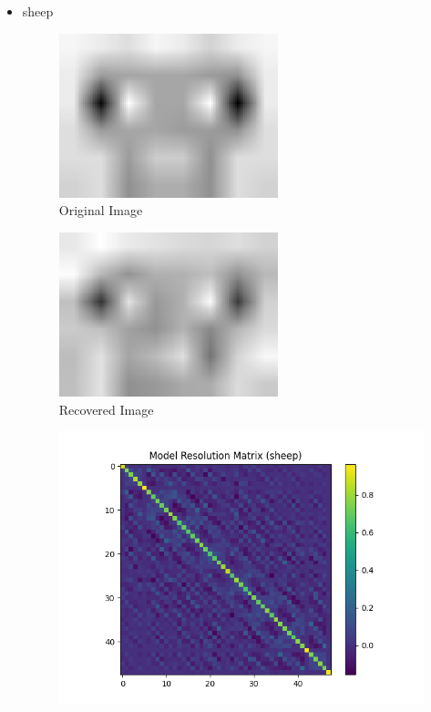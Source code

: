 \documentclass{article}
\begin{document}
\begin{itemize}
    \item sheep
\begin{figure}[h]
    \centering
    \includegraphics[width=0.6\textwidth]{images/greyscale/sheep.png}
    \caption{Original Image}
\end{figure}
\begin{figure}[h]
    \centering
    \includegraphics[width=0.6\textwidth]{images/outputs/sheep.png}
    \caption{Recovered Image}
\end{figure}
\begin{figure}[h]
    \centering
    \includegraphics[width=1\textwidth]{images/outputs/modelres/sheep.png}

\end{figure}
\end{itemize}
\end{document}
